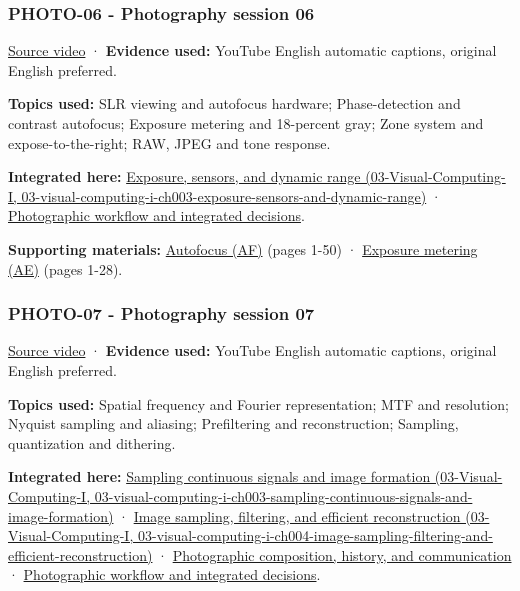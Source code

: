 \subsubsection{PHOTO-06 - Photography session 06}\label{04-visual-computing-ii-ch036-photo-06---photography-session-06}

\href{https://www.youtube.com/watch?v=njlDb9-6aOU}{Source video} · \textbf{Evidence used:} YouTube English automatic captions, original English preferred.

\textbf{Topics used:} SLR viewing and autofocus hardware; Phase-detection and contrast autofocus; Exposure metering and 18-percent gray; Zone system and expose-to-the-right; RAW, JPEG and tone response.

\textbf{Integrated here:} \href{../03-Visual-Computing-I/main.pdf\#nameddest=03-visual-computing-i-ch003-exposure-sensors-and-dynamic-range}{Exposure, sensors, and dynamic range (03-Visual-Computing-I, 03-visual-computing-i-ch003-exposure-sensors-and-dynamic-range)} · \hyperref[04-visual-computing-ii-ch034-photographic-workflow-and-integrated-decisions]{Photographic workflow and integrated decisions}.

\textbf{Supporting materials:} \href{https://drive.google.com/open?id=0B6w2XfPHEcZYQnR3SG43Z2VIRmM}{Autofocus (AF)} (pages 1-50) · \href{https://drive.google.com/open?id=0B6w2XfPHEcZYbG9EWlhacm80SFE}{Exposure metering (AE)} (pages 1-28).

\subsubsection{PHOTO-07 - Photography session 07}\label{04-visual-computing-ii-ch036-photo-07---photography-session-07}

\href{https://www.youtube.com/watch?v=02tgqvQzp0Y}{Source video} · \textbf{Evidence used:} YouTube English automatic captions, original English preferred.

\textbf{Topics used:} Spatial frequency and Fourier representation; MTF and resolution; Nyquist sampling and aliasing; Prefiltering and reconstruction; Sampling, quantization and dithering.

\textbf{Integrated here:} \href{../03-Visual-Computing-I/main.pdf\#nameddest=03-visual-computing-i-ch003-sampling-continuous-signals-and-image-formation}{Sampling continuous signals and image formation (03-Visual-Computing-I, 03-visual-computing-i-ch003-sampling-continuous-signals-and-image-formation)} · \href{../03-Visual-Computing-I/main.pdf\#nameddest=03-visual-computing-i-ch004-image-sampling-filtering-and-efficient-reconstruction}{Image sampling, filtering, and efficient reconstruction (03-Visual-Computing-I, 03-visual-computing-i-ch004-image-sampling-filtering-and-efficient-reconstruction)} · \hyperref[04-visual-computing-ii-ch034-photographic-composition-history-and-communication]{Photographic composition, history, and communication} · \hyperref[04-visual-computing-ii-ch034-photographic-workflow-and-integrated-decisions]{Photographic workflow and integrated decisions}.

